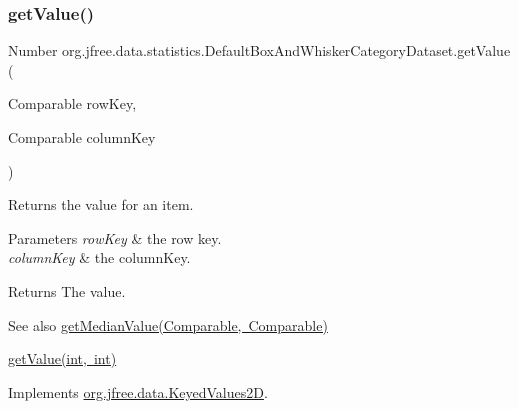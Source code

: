 \subsubsection{\texorpdfstring{get\+Value()}{getValue()}\hspace{0.1cm}{\footnotesize\ttfamily [2/2]}}
{\footnotesize\ttfamily Number org.\+jfree.\+data.\+statistics.\+Default\+Box\+And\+Whisker\+Category\+Dataset.\+get\+Value (\begin{DoxyParamCaption}\item[{Comparable}]{row\+Key,  }\item[{Comparable}]{column\+Key }\end{DoxyParamCaption})}

Returns the value for an item.


\begin{DoxyParams}{Parameters}
{\em row\+Key} & the row key. \\
\hline
{\em column\+Key} & the column\+Key.\\
\hline
\end{DoxyParams}
\begin{DoxyReturn}{Returns}
The value.
\end{DoxyReturn}
\begin{DoxySeeAlso}{See also}
\mbox{\hyperlink{classorg_1_1jfree_1_1data_1_1statistics_1_1_default_box_and_whisker_category_dataset_a2db62c7c2bbb443cb7f03058c64c2a76}{get\+Median\+Value(\+Comparable, Comparable)}} 

\mbox{\hyperlink{classorg_1_1jfree_1_1data_1_1statistics_1_1_default_box_and_whisker_category_dataset_ad81af186cdf52a94633a5a1a3d3200ba}{get\+Value(int, int)}} 
\end{DoxySeeAlso}


Implements \mbox{\hyperlink{interfaceorg_1_1jfree_1_1data_1_1_keyed_values2_d_a61c450ca108cd99e53174fc91393a99a}{org.\+jfree.\+data.\+Keyed\+Values2D}}.

\mbox{\label{classorg_1_1jfree_1_1data_1_1statistics_1_1_default_box_and_whisker_category_dataset_a822e79c57ac5bfc5061b0061636a40ae}} 
